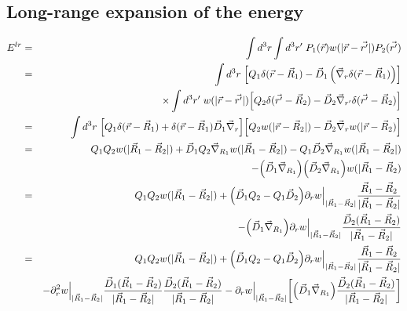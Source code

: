\documentclass[11pt,a4paper]{report}
\begin{document}
\subsection{Long-range expansion of the energy}
\begin{eqnarray}
E^{lr}
&=&\int d^3r\int d^3r'\;P_1(\vec{r})w(|\vec{r}-\vec{r'}|)P_2(\vec{r'})
\nonumber\\
%
%
%
&=&\int d^3r\;
\Bigl[
Q_1\delta(\vec{r}-\vec{R}_1)
-\vec{D}_1\left(\vec{\nabla}_r\delta(\vec{r}-\vec{R}_1)\right)
\Bigr]
\nonumber\\
&&\hspace{1cm}\times
\int d^3r'\;w(|\vec{r}-\vec{r'}|)
\Bigl[
Q_2\delta(\vec{r'}-\vec{R}_2)
-\vec{D}_2\vec{\nabla}_{r'}\delta(\vec{r'}-\vec{R}_2)
\Bigr]
\nonumber\\
%
%
%
&=&\int d^3r\;
\Bigl[
Q_1\delta(\vec{r}-\vec{R}_1)
+\delta(\vec{r}-\vec{R}_1)\vec{D}_1\vec{\nabla}_r
\Bigr]
\Bigl[
Q_2w(|\vec{r}-\vec{R}_2|)
-\vec{D}_2\vec{\nabla}_{r}w(|\vec{r}-\vec{R}_2)
\Bigr]
\nonumber\\
%
%
%
&=&
Q_1Q_2w(|\vec{R}_1-\vec{R}_2|)
+\vec{D}_1Q_2\vec{\nabla}_{R_1}w(|\vec{R}_1-\vec{R}_2|)
-Q_1\vec{D}_2\vec{\nabla}_{R_1}w(|\vec{R}_1-\vec{R}_2|)
\nonumber\\
&&-\Bigl(\vec{D}_1\vec{\nabla}_{R_1}\Bigr)
\Bigl(\vec{D}_2\vec{\nabla}_{R_1}\Bigr)w(|\vec{R}_1-\vec{R}_2)
\nonumber\\
%
%
%
&=&
Q_1Q_2w(|\vec{R}_1-\vec{R}_2|)
+\Bigl(\vec{D}_1Q_2-Q_1\vec{D}_2\Bigr)
\Bigl.\partial_rw\Bigr|_{|\vec{R}_1-\vec{R}_2|}
\frac{\vec{R}_1-\vec{R}_2}{|\vec{R}_1-\vec{R}_2|}
\nonumber\\
&&-\Bigl(\vec{D}_1\vec{\nabla}_{R_1}\Bigr)
\Bigl.\partial_rw\Bigr|_{|\vec{R}_1-\vec{R}_2|}
\frac{\vec{D}_2(\vec{R}_1-\vec{R}_2)}{|\vec{R}_1-\vec{R}_2|}
\nonumber\\
%
%
%
&=&
Q_1Q_2w(|\vec{R}_1-\vec{R}_2|)
+\Bigl(\vec{D}_1Q_2-Q_1\vec{D}_2\Bigr)
\Bigl.\partial_rw\Bigr|_{|\vec{R}_1-\vec{R}_2|}
\frac{\vec{R}_1-\vec{R}_2}{|\vec{R}_1-\vec{R}_2|}
\nonumber\\
&&
-\Bigl.\partial^2_rw\Bigr|_{|\vec{R}_1-\vec{R}_2|}
\frac{\vec{D}_1(\vec{R}_1-\vec{R}_2)}{|\vec{R}_1-\vec{R}_2|}
\frac{\vec{D}_2(\vec{R}_1-\vec{R}_2)}{|\vec{R}_1-\vec{R}_2|}
-
\Bigl.\partial_rw\Bigr|_{|\vec{R}_1-\vec{R}_2|}
\biggl[
\Bigl(\vec{D}_1\vec{\nabla}_{R_1}\Bigr)
\frac{\vec{D}_2(\vec{R}_1-\vec{R}_2)}{|\vec{R}_1-\vec{R}_2|}
\biggr]
\nonumber\\

\end{eqnarray}
\end{document}
